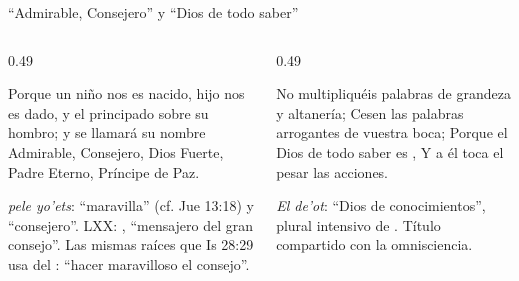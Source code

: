 \begin{frame}{``Admirable, Consejero'' y ``Dios de todo saber''}
\begin{columns}[t,onlytextwidth]
\begin{column}{0.49\textwidth}
\begin{cita}Porque un niño nos es nacido, hijo nos es dado, y el principado sobre su hombro; y se llamará su nombre Admirable, Consejero, Dios Fuerte, Padre Eterno, Príncipe de Paz.\end{cita}
\scriptsize{} \emph{pele yo'ets}: ``maravilla'' (cf. Jue 13:18) y ``consejero''. LXX: , ``mensajero del gran consejo''. Las mismas raíces que Is 28:29 usa del \SENOR{}: ``hacer maravilloso el consejo''.\par\smallskip
{}
\end{column}
\begin{column}{0.49\textwidth}
\begin{cita}No multipliquéis palabras de grandeza y altanería; Cesen las palabras arrogantes de vuestra boca; Porque el Dios de todo saber es \SENOR{}, Y a él toca el pesar las acciones.\end{cita}
\scriptsize{} \emph{El de'ot}: ``Dios de conocimientos'', plural intensivo de . Título compartido con la omnisciencia.\par\smallskip
{}
\end{column}
\end{columns}
\end{frame}

